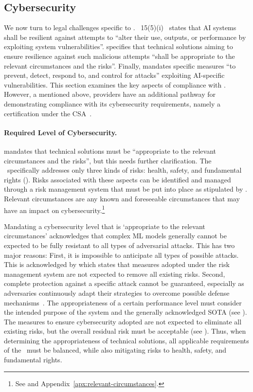  \subsection{Cybersecurity }\label{sec:challenges_cybersecurity}

We now turn to legal challenges specific to . \Artx\ 15(5)(i) \EUAIAct\ states that AI systems shall be resilient against attempts to ``alter their use, outputs, or performance by exploiting system vulnerabilities''.  specifies that technical solutions aiming to ensure resilience against such malicious attempts ``shall be appropriate to the relevant circumstances and the risks''. Finally,  mandates specific measures ``to prevent, detect, respond to, and control for attacks'' exploiting AI-specific vulnerabilities. 
%
This section examines the key aspects of compliance with .
However, a mentioned above, providers have an additional pathway for demonstrating compliance with its cybersecurity requirements, namely a certification under the CSA~\cite{casarosa2022cybersecurity}.


\paragraph{Required Level of Cybersecurity.}
%
 mandates that technical solutions must be ``appropriate to the relevant circumstances and the risks'', but this needs further clarification.
% 
The \EUAIAct\ specifically addresses only three kinds of risks: health, safety, and fundamental rights (). 
%
Risks associated with these aspects can be identified and managed through a risk management system that must be put into place as stipulated by .
%
Relevant circumstances are any known and foreseeable circumstances that may have an impact on cybersecurity.\footnote{See  and Appendix~\ref{apx:relevant-circumstances}.}

Mandating a cybersecurity level that is `appropriate to the relevant circumstances' acknowledges that complex ML models generally cannot be expected to be fully resistant to all types of adversarial attacks.
%
This has two major reasons: First, it is impossible to anticipate all types of possible attacks. 
This is acknowledged by  which states that measures adopted under the risk management system are not expected to remove all existing risks.
Second, complete protection against a specific attack cannot be guaranteed, especially as adversaries continuously adapt their strategies to overcome possible defense mechanisms~\citep{xie2023defending, kumar2023certifying}. 
% 
The appropriateness of a certain performance level must consider the intended purpose of the system and the generally acknowledged SOTA (see ).
%
The measures to ensure cybersecurity adopted are not expected to eliminate all existing risks, but the overall residual risk must be acceptable (see ).
%
Thus, when determining the appropriateness of technical solutions, all applicable requirements of the \EUAIAct\ must be balanced, while also mitigating risks to health, safety, and fundamental rights.
% 

